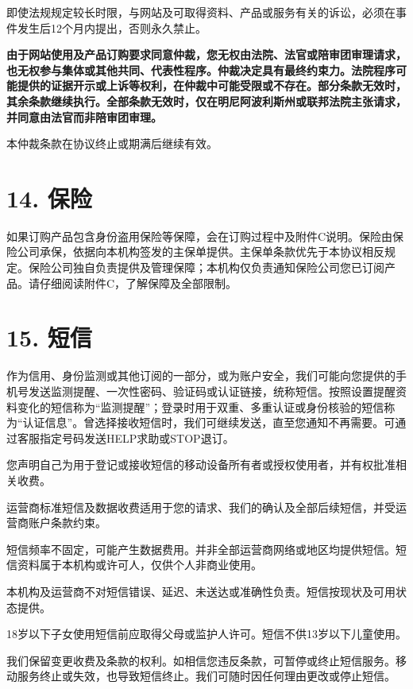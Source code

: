 \documentclass[UTF8,fontset=none,11pt,a4paper]{ctexart}
\begin{document}
即使法规规定较长时限，与网站及可取得资料、产品或服务有关的诉讼，必须在事件发生后12个月内提出，否则\allowbreak\mbox{永久禁止。}


\textbf{由于网站使用及产品订购要求同意仲裁，您无权由法院、法官或陪审团审理请求，也无权参与集体或其他共同、代表性程序。仲裁决定具有最终约束力。法院程序可能提供的证据开示或上诉等权利，在仲裁中可能受限或不存在。部分条款无效时，其余条款继续执行。全部条款无效时，仅在明尼阿波利斯州或联邦法院主张请求，并同意由法官而非陪审团审理。}


本仲裁条款在协议终止或期满后\allowbreak\mbox{继续有效。}


\section*{14. 保险}
如果订购产品包含身份盗用保险等保障，会在订购过程中及附件C说明。保险由保险公司承保，依据向本机构签发的主保单提供。主保单条款优先于本协议相反规定。保险公司独自负责提供及管理保障；本机构仅负责通知保险公司您已订阅产品。请仔细阅读附件C，了解保障及\allowbreak\mbox{全部限制。}


\section*{15. 短信}
作为信用、身份监测或其他订阅的一部分，或为账户安全，我们可能向您提供的手机号发送监测提醒、一次性密码、验证码或认证链接，统称短信。按照设置提醒资料变化的短信称为“监测提醒”；登录时用于双重、多重认证或身份核验的短信称为“认证信息”。曾选择接收短信时，我们可继续发送，直至您通知不再需要。可通过客服指定号码发送HELP求助或STOP退订。


您声明自己为用于登记或接收短信的移动设备所有者或授权使用者，并有权批准\allowbreak\mbox{相关收费。}


运营商标准短信及数据收费适用于您的请求、我们的确认及全部后续短信，并受运营商账户\allowbreak\mbox{条款约束。}


短信频率不固定，可能产生数据费用。并非全部运营商网络或地区均提供短信。短信资料属于本机构或许可人，仅供个人非\allowbreak\mbox{商业使用。}


本机构及运营商不对短信错误、延迟、未送达或准确性负责。短信按现状及可用\allowbreak\mbox{状态提供。}


18岁以下子女使用短信前应取得父母或监护人许可。短信不供13岁以下\allowbreak\mbox{儿童使用。}


我们保留变更收费及条款的权利。如相信您违反条款，可暂停或终止短信服务。移动服务终止或失效，也导致短信终止。我们可随时因任何理由更改或\allowbreak\mbox{停止短信。}
\end{document}
